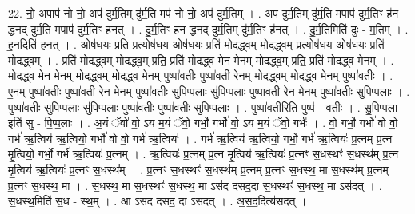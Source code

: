 \documentclass[17pt]{extarticle}
\begin{document}
22. नो॒ अपाप॑ नो नो॒ अप॑ दुर्म॒तिम् दु॑र्म॒ति मप॑ नो नो॒ अप॑ दुर्म॒तिम् । . अप॑ दुर्म॒तिम् दु॑र्म॒ति मपाप॑ दुर्म॒तिꣳ ह॑न द्धनद् दुर्म॒ति मपाप॑ दुर्म॒तिꣳ ह॑नत् । . दु॒र्म॒तिꣳ ह॑न द्धनद् दुर्म॒तिम् दु॑र्म॒तिꣳ ह॑नत् । . दु॒र्म॒तिमिति॑ दुः - म॒तिम् । . ह॒न॒दिति॑ हनत् । . ओष॑धयः॒ प्रति॒ प्रत्योष॑धय॒ ओष॑धयः॒ प्रति॑ मोदद्ध्वम् मोदद्ध्व॒म् प्रत्योष॑धय॒ ओष॑धयः॒ प्रति॑ मोदद्ध्वम् । . प्रति॑ मोदद्ध्वम् मोदद्ध्व॒म् प्रति॒ प्रति॑ मोदद्ध्व मेन मेनम् मोदद्ध्व॒म् प्रति॒ प्रति॑ मोदद्ध्व मेनम् । . मो॒द॒द्ध्व॒ मे॒न॒ मे॒न॒म् मो॒द॒द्ध्व॒म् मो॒द॒द्ध्व॒ मे॒न॒म् पुष्पा॑वतीः॒ पुष्पा॑वती रेनम् मोदद्ध्वम् मोदद्ध्व मेन॒म् पुष्पा॑वतीः । . ए॒न॒म् पुष्पा॑वतीः॒ पुष्पा॑वती रेन मेन॒म् पुष्पा॑वतीः सुपिप्प॒लाः सु॑पिप्प॒लाः पुष्पा॑वती रेन मेन॒म् पुष्पा॑वतीः सुपिप्प॒लाः । . पुष्पा॑वतीः सुपिप्प॒लाः सु॑पिप्प॒लाः पुष्पा॑वतीः॒ पुष्पा॑वतीः सुपिप्प॒लाः । . पुष्पा॑वती॒रिति॒ पुष्प॑ - व॒तीः॒ । . सु॒पि॒प्प॒ला इति॑ सु - पि॒प्प॒लाः । . अ॒यं ॅवो॑ वो॒ ऽय म॒यं ॅवो॒ गर्भो॒ गर्भो॑ वो॒ ऽय म॒यं ॅवो॒ गर्भः॑ । . वो॒ गर्भो॒ गर्भो॑ वो वो॒ गर्भ॑ ऋ॒त्विय॑ ऋ॒त्वियो॒ गर्भो॑ वो वो॒ गर्भ॑ ऋ॒त्वियः॑ । . गर्भ॑ ऋ॒त्विय॑ ऋ॒त्वियो॒ गर्भो॒ गर्भ॑ ऋ॒त्वियः॑ प्र॒त्नम् प्र॒त्न मृ॒त्वियो॒ गर्भो॒ गर्भ॑ ऋ॒त्वियः॑ प्र॒त्नम् । . ऋ॒त्वियः॑ प्र॒त्नम् प्र॒त्न मृ॒त्विय॑ ऋ॒त्वियः॑ प्र॒त्नꣳ स॒धस्थꣳ॑ स॒धस्थ॑म् प्र॒त्न मृ॒त्विय॑ ऋ॒त्वियः॑ प्र॒त्नꣳ स॒धस्थ᳚म् । . प्र॒त्नꣳ स॒धस्थꣳ॑ स॒धस्थ॑म् प्र॒त्नम् प्र॒त्नꣳ स॒धस्थ॒ मा स॒धस्थ॑म् प्र॒त्नम् प्र॒त्नꣳ स॒धस्थ॒ मा । . स॒धस्थ॒ मा स॒धस्थꣳ॑ स॒धस्थ॒ मा ऽस॑द दसद॒दा स॒धस्थꣳ॑ स॒धस्थ॒ मा ऽस॑दत् । . स॒धस्थ॒मिति॑ स॒ध - स्थ॒म् । . आ ऽस॑द दसद॒ दा ऽस॑दत् । . अ॒स॒द॒दित्य॑सदत् । \newline
\pagebreak
{}
\end{document}
